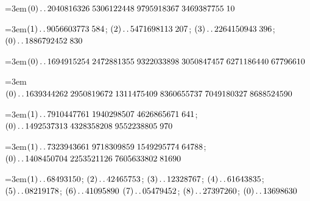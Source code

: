 \par\noindent\hangindent=3em\enspace $(0)\mathinner{.\,.}2040816326\;\allowbreak 5306122448\;\allowbreak 9795918367\;\allowbreak 3469387755\;\allowbreak 10$\par\smallskip

\par\noindent\hangindent=3em\enspace $(1)\mathinner{.\,.}9056603773\;\allowbreak 584$; $(2)\mathinner{.\,.}5471698113\;\allowbreak 207$; $(3)\mathinner{.\,.}2264150943\;\allowbreak 396$; $(0)\mathinner{.\,.}1886792452\;\allowbreak 830$\par\smallskip

\par\noindent\hangindent=3em\enspace $(0)\mathinner{.\,.}1694915254\;\allowbreak 2472881355\;\allowbreak 9322033898\;\allowbreak 3050847457\;\allowbreak 6271186440\;\allowbreak 67796610$\par\smallskip

\par\noindent\hangindent=3em\enspace $(0)\mathinner{.\,.}1639344262\;\allowbreak 2950819672\;\allowbreak 1311475409\;\allowbreak 8360655737\;\allowbreak 7049180327\;\allowbreak 8688524590$\par\smallskip

\par\noindent\hangindent=3em\enspace $(1)\mathinner{.\,.}7910447761\;\allowbreak 1940298507\;\allowbreak 4626865671\;\allowbreak 641$; $(0)\mathinner{.\,.}1492537313\;\allowbreak 4328358208\;\allowbreak 9552238805\;\allowbreak 970$\par\smallskip

\par\noindent\hangindent=3em\enspace $(1)\mathinner{.\,.}7323943661\;\allowbreak 9718309859\;\allowbreak 1549295774\;\allowbreak 64788$; $(0)\mathinner{.\,.}1408450704\;\allowbreak 2253521126\;\allowbreak 7605633802\;\allowbreak 81690$\par\smallskip

\par\noindent\hangindent=3em\enspace $(1)\mathinner{.\,.}68493150$; $(2)\mathinner{.\,.}42465753$; $(3)\mathinner{.\,.}12328767$; $(4)\mathinner{.\,.}61643835$; $(5)\mathinner{.\,.}08219178$; $(6)\mathinner{.\,.}41095890$ $(7)\mathinner{.\,.}05479452$; $(8)\mathinner{.\,.}27397260$; $(0)\mathinner{.\,.}13698630$\par\smallskip


